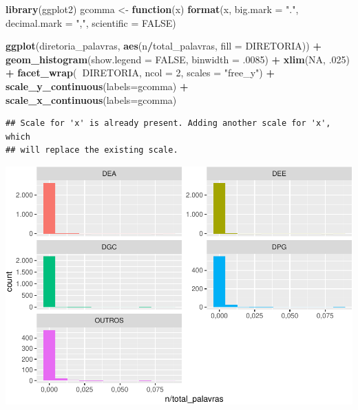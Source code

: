 \documentclass[]{article}
\newenvironment{Shaded}{\begin{snugshade}}{\end{snugshade}}
\newcommand{\KeywordTok}[1]{\textcolor[rgb]{0.13,0.29,0.53}{\textbf{#1}}}
\newcommand{\DataTypeTok}[1]{\textcolor[rgb]{0.13,0.29,0.53}{#1}}
\newcommand{\DecValTok}[1]{\textcolor[rgb]{0.00,0.00,0.81}{#1}}
\newcommand{\StringTok}[1]{\textcolor[rgb]{0.31,0.60,0.02}{#1}}
\newcommand{\OtherTok}[1]{\textcolor[rgb]{0.56,0.35,0.01}{#1}}
\newcommand{\ControlFlowTok}[1]{\textcolor[rgb]{0.13,0.29,0.53}{\textbf{#1}}}
\newcommand{\OperatorTok}[1]{\textcolor[rgb]{0.81,0.36,0.00}{\textbf{#1}}}
\newcommand{\NormalTok}[1]{#1}
\begin{document}
\begin{Shaded}
\begin{Highlighting}[]
\KeywordTok{library}\NormalTok{(ggplot2)}
\NormalTok{gcomma <-}\StringTok{ }\ControlFlowTok{function}\NormalTok{(x) }\KeywordTok{format}\NormalTok{(x, }\DataTypeTok{big.mark =} \StringTok{"."}\NormalTok{, }\DataTypeTok{decimal.mark =} \StringTok{","}\NormalTok{, }\DataTypeTok{scientific =} \OtherTok{FALSE}\NormalTok{) }

\KeywordTok{ggplot}\NormalTok{(diretoria_palavras, }\KeywordTok{aes}\NormalTok{(n}\OperatorTok{/}\NormalTok{total_palavras, }\DataTypeTok{fill =}\NormalTok{ DIRETORIA)) }\OperatorTok{+}
\KeywordTok{geom_histogram}\NormalTok{(}\DataTypeTok{show.legend =} \OtherTok{FALSE}\NormalTok{, }\DataTypeTok{binwidth =}\NormalTok{ .}\DecValTok{0085}\NormalTok{) }\OperatorTok{+}\StringTok{ }\KeywordTok{xlim}\NormalTok{(}\OtherTok{NA}\NormalTok{, .}\DecValTok{025}\NormalTok{) }\OperatorTok{+}
\KeywordTok{facet_wrap}\NormalTok{(}\OperatorTok{~}\NormalTok{DIRETORIA, }\DataTypeTok{ncol =} \DecValTok{2}\NormalTok{, }\DataTypeTok{scales =} \StringTok{"free_y"}\NormalTok{) }\OperatorTok{+}
\StringTok{  }\KeywordTok{scale_y_continuous}\NormalTok{(}\DataTypeTok{labels=}\NormalTok{gcomma) }\OperatorTok{+}\StringTok{ }
\StringTok{  }\KeywordTok{scale_x_continuous}\NormalTok{(}\DataTypeTok{labels=}\NormalTok{gcomma)}
\end{Highlighting}
\end{Shaded}

\begin{verbatim}
## Scale for 'x' is already present. Adding another scale for 'x', which
## will replace the existing scale.
\end{verbatim}

\includegraphics{markdown_v30_files/figure-latex/unnamed-chunk-27-1.pdf}
\end{document}
